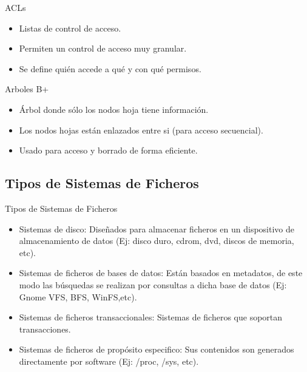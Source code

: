 \begin{frame}{ACLs}
  \begin{itemize}
    \item Listas de control de acceso.
    \item Permiten un control de acceso muy granular.
    \item Se define quién accede a qué y con qué permisos.
  \end{itemize}
\end{frame}

\begin{frame}{Arboles B+}
  \begin{itemize}
    \item Árbol donde sólo los nodos hoja tiene información.
    \item Los nodos hojas están enlazados entre si (para acceso secuencial).
    \item Usado para acceso y borrado de forma eficiente.
  \end{itemize}
\end{frame}

\subsection*{Tipos de Sistemas de Ficheros}
\begin{frame}{Tipos de Sistemas de Ficheros}
  \begin{itemize}
    \item Sistemas de disco: Diseñados para almacenar ficheros en un dispositivo de almacenamiento de datos (Ej: disco duro, cdrom, dvd, discos de memoria, etc).
    \item Sistemas de ficheros de bases de datos: Están basados en metadatos, de este modo las búsquedas se realizan por consultas a dicha base de datos (Ej: Gnome VFS, BFS, WinFS,etc).
    \item Sistemas de ficheros transaccionales: Sistemas de ficheros que soportan transacciones.
    \item Sistemas de ficheros de propósito especifico: Sus contenidos son generados directamente por software (Ej: /proc, /sys, etc).
  \end{itemize}
\end{frame}
